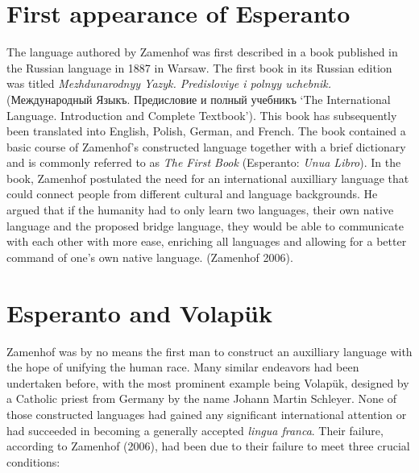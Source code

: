 \section{First appearance of Esperanto}
The language authored by Zamenhof was first described in a book published in the Russian language in 1887 in Warsaw.
The first book in its Russian edition was titled \textit{Mezhdunarodnyy Yazyk. Predisloviye i polnyy uchebnik.}
(Между\-на\-род\-ный Языкъ. Предисловие и полный учебникъ `The International Language. Introduction and Complete Textbook').
This book has subsequently been translated into English, %
Polish, German, and French.
The book contained a basic course of Zamenhof's constructed language together with a brief dictionary and is commonly referred to as \textit{The First Book} (Esperanto: \textit{Unua Libro}).
In the book, Zamenhof postulated the need for an international auxilliary language that could connect people from different cultural and language backgrounds.
He argued that if the humanity had to only learn two languages, their own native language and the proposed bridge language, they would be able to communicate with each other with more ease, enriching all languages and allowing for a better command of one's own native language.
(Zamenhof 2006).

\section{Esperanto and Volapük}
Zamenhof was by no means the first man to construct an auxilliary language with the hope of unifying the human race.
Many similar endeavors had been undertaken before, with the most prominent example being Volapük, designed by a Catholic priest from Germany by the name Johann Martin Schleyer.
None of those constructed languages had gained any significant international attention or had succeeded in becoming a generally accepted \textit{lingua franca}.
Their failure, according to Zamenhof (2006), had been due to their failure to meet three crucial conditions:

